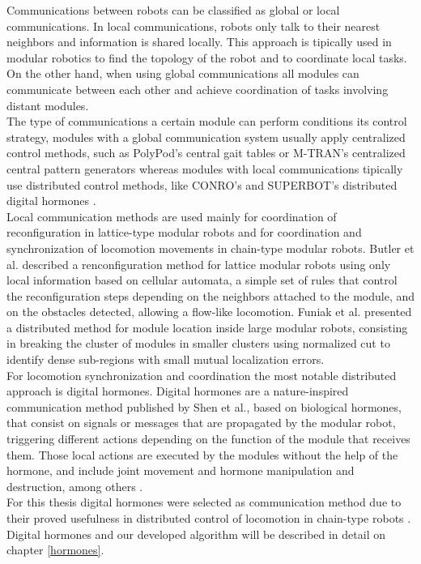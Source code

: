 Communications between robots can be classified as global or local communications. In local communications, robots only talk to their nearest neighbors and information is shared locally. This approach is tipically used in modular robotics to find the topology of the robot and to coordinate local tasks. On the other hand, when using global communications all modules can communicate between each other and achieve coordination of tasks involving distant modules.\\

The type of communications a certain module can perform conditions its control strategy, modules with a global communication system usually apply centralized control methods, such as PolyPod's central gait tables\cite{Yim2000} or M-TRAN's centralized central pattern generators\cite{Kamimura2005} whereas modules with local communications tipically use distributed control methods, like CONRO's and SUPERBOT's distributed digital hormones \cite{Shen2002}.\\

Local communication methods are used mainly for coordination of reconfiguration in lattice-type modular robots and for coordination and synchronization of locomotion movements in chain-type modular robots. Butler et al. described a renconfiguration method for lattice modular robots using only local information based on cellular automata, a simple set of rules that control the reconfiguration steps depending on the neighbors attached to the module, and on the obstacles detected, allowing a flow-like locomotion\cite{Butler2004}. Funiak et al. presented a distributed method for module location inside large modular robots, consisting in breaking the cluster of modules in smaller clusters using normalized cut to identify dense sub-regions with small mutual localization errors\cite{Funiak2009}.\\

For locomotion synchronization and coordination the most notable distributed approach is digital hormones. Digital hormones are a nature-inspired communication method published by Shen et al., based on biological hormones, that consist on signals or messages that are propagated by the modular robot, triggering different actions depending on the function of the module that receives them. Those local actions are executed by the modules without the help of the hormone, and include joint movement and hormone manipulation and destruction, among others \cite{Shen2000}.\\

For this thesis digital hormones were selected as communication method due to their proved usefulness in distributed control of locomotion in chain-type robots \cite{Shen2002, Hou2006}. Digital hormones and our developed algorithm will be described in detail on chapter \ref{hormones}.\\

